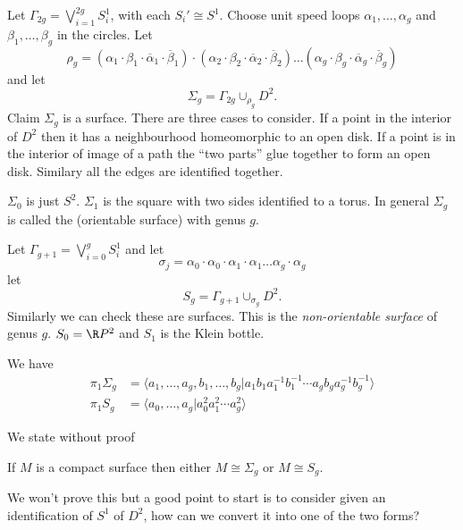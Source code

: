 \documentclass[a4paper]{article}
\begin{document}
\begin{eg}
  Let \(\Gamma_{2g} = \bigvee_{i = 1}^{2g} S_i^1\), with each \(S_i' \cong S^1\). Choose unit speed loops \(\alpha_1, \dots, \alpha_g\) and \(\beta_1, \dots, \beta_g\) in the circles. Let
  \[
    \rho_g = (\alpha_1 \cdot \beta_1 \cdot \overline \alpha_1 \cdot \overline \beta_1) \cdot (\alpha_2 \cdot \beta_2 \cdot \overline \alpha_2 \cdot \overline \beta_2) \dots (\alpha_g \cdot \beta_g \cdot \overline \alpha_g \cdot \overline \beta_g)
  \]
  and let
  \[
    \Sigma_g = \Gamma_{2g} \cup_{\rho_g} D^2.
  \]
  Claim \(\Sigma_g\) is a surface. There are three cases to consider. If a point in the interior of \(D^2\) then it has a neighbourhood homeomorphic to an open disk. If a point is in the interior of image of a path the ``two parts'' glue together to form an open disk. Similary all the edges are identified together.

  \(\Sigma_0\) is just \(S^2\). \(\Sigma_1\) is the square with two sides identified to a torus. In general \(\Sigma_g\) is called the (orientable surface) with genus \(g\).
\end{eg}

\begin{eg}
  Let \(\Gamma_{g + 1} = \bigvee_{i = 0}^g S_i^1\) and let
  \[
    \sigma_j = \alpha_0 \cdot \alpha_0 \cdot \alpha_1 \cdot \alpha_1 \dots \alpha_g \cdot \alpha_g
  \]
  let
  \[
    S_g = \Gamma_{g + 1} \cup_{\sigma_g} D^2.
  \]
  Similarly we can check these are surfaces. This is the \emph{non-orientable surface} of genus \(g\). \(S_0 = \R P^2\) and \(S_1\) is the Klein bottle.

  We have
  \begin{align*}
    \pi_1 \Sigma_g &= \langle a_1, \dots, a_g, b_1, \dots, b_g | a_1b_1a_1^{-1}b_1^{-1} \cdots a_gb_ga_g^{-1}b_g^{-1}\rangle \\
    \pi_1 S_g &= \langle a_0, \dots, a_g | a_0^2 a_1^2 \cdots a_g^2 \rangle
  \end{align*}
\end{eg}

We state without proof

\begin{theorem}
  If \(M\) is a compact surface then either \(M \cong \Sigma_g\) or \(M \cong S_g\).
\end{theorem}

We won't prove this but a good point to start is to consider given an identification of \(S^1\) of \(D^2\), how can we convert it into one of the two forms?
\end{document}
